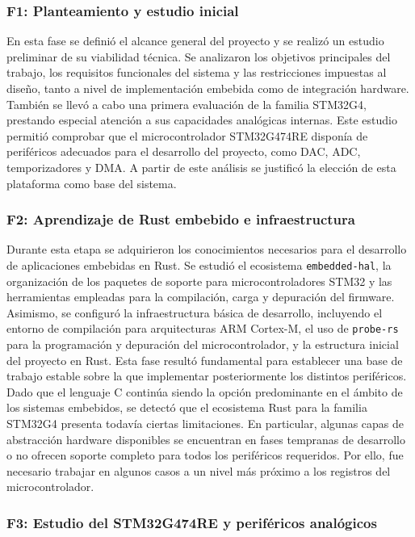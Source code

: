 \documentclass[11pt,a4paper]{article}
\begin{document}
\subsubsection{F1: Planteamiento y estudio inicial}

En esta fase se definió el alcance general del proyecto y se realizó un estudio preliminar de su viabilidad técnica. Se analizaron los objetivos principales del trabajo, los requisitos funcionales del sistema y las restricciones impuestas al diseño, tanto a nivel de implementación embebida como de integración hardware.
También se llevó a cabo una primera evaluación de la familia STM32G4, prestando especial atención a sus capacidades analógicas internas. Este estudio permitió comprobar que el microcontrolador STM32G474RE disponía de periféricos adecuados para el desarrollo del proyecto, como DAC, ADC, temporizadores y DMA. A partir de este análisis se justificó la elección de esta plataforma como base del sistema.


\subsubsection{F2: Aprendizaje de Rust embebido e infraestructura}

Durante esta etapa se adquirieron los conocimientos necesarios para el desarrollo de aplicaciones embebidas en Rust. Se estudió el ecosistema \texttt{embedded-hal}, la organización de los paquetes de soporte para microcontroladores STM32 y las herramientas empleadas para la compilación, carga y depuración del firmware.
Asimismo, se configuró la infraestructura básica de desarrollo, incluyendo el entorno de compilación para arquitecturas ARM Cortex-M, el uso de \texttt{probe-rs} para la programación y depuración del microcontrolador, y la estructura inicial del proyecto en Rust. Esta fase resultó fundamental para establecer una base de trabajo estable sobre la que implementar posteriormente los distintos periféricos.
Dado que el lenguaje C continúa siendo la opción predominante en el ámbito de los sistemas embebidos, se detectó que el ecosistema Rust para la familia STM32G4 presenta todavía ciertas limitaciones. En particular, algunas capas de abstracción hardware disponibles se encuentran en fases tempranas de desarrollo o no ofrecen soporte completo para todos los periféricos requeridos. Por ello, fue necesario trabajar en algunos casos a un nivel más próximo a los registros del microcontrolador.


\subsubsection{F3: Estudio del STM32G474RE y periféricos analógicos}
\end{document}
